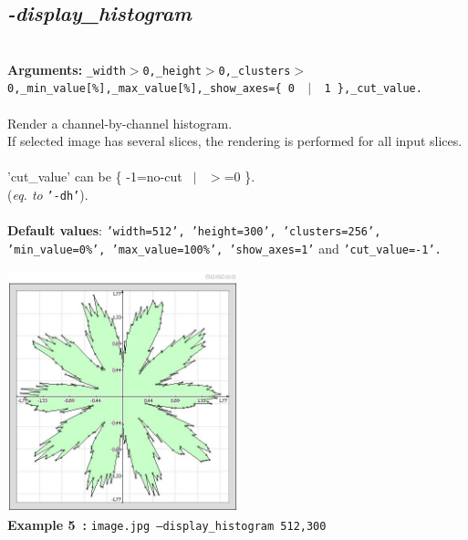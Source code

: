\documentclass[a4paper,11pt,twoside]{book}
\begin{document}
\subsection{\emph{-display\_histogram} }\vspace*{-0.5em}
~\\\textbf{Arguments: } 
{\small \texttt{\_width$>$0,\_height$>$0,\_clusters$>$0,\_min\_value[\%],\_max\_value[\%],\_show\_axes=\{ 0 ~$|$~ 1 \},\_cut\_value.}}\\~\\
Render a channel-by-channel histogram.
~\\If selected image has several slices, the rendering is performed for all input slices.
~\\'cut\_value' can be \{ -1=no-cut ~$|$~ $>$=0 \}.
~\\(\emph{eq. to} {\small \texttt{'-dh'}}).
~\\~\\\textbf{Default values}: {\small \texttt{'width=512', 'height=300', 'clusters=256', 'min\_value=0\%', 'max\_value=100\%', 'show\_axes=1'} and \texttt{'cut\_value=-1'.}}
\begin{center}\includegraphics[keepaspectratio=true,height=7cm,width=\textwidth]{img/gmic_def5.jpg}\\
{\footnotesize \textbf{Example 5~:} \texttt{image.jpg --display\_histogram 512,300}}
\end{center}
\end{document}
